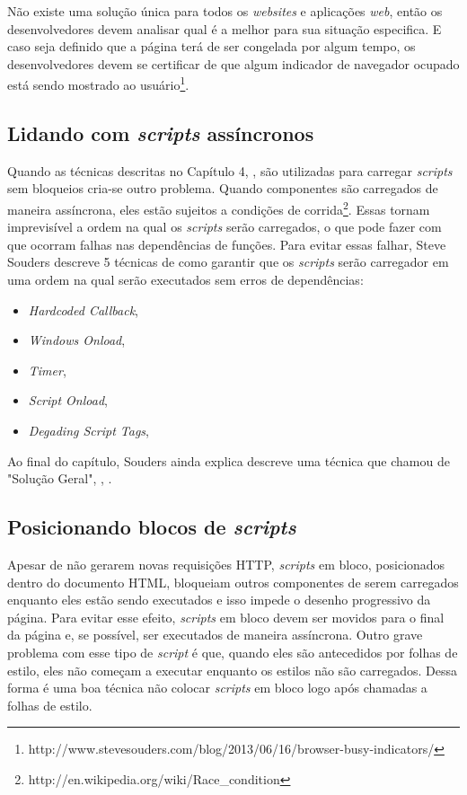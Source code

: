 Não existe uma solução única para todos os \textit{websites} e aplicações \textit{web}, então os desenvolvedores devem analisar qual é a melhor para sua situação especifica. E caso seja definido que a página terá de ser congelada por algum tempo, os desenvolvedores devem se certificar de que algum indicador de navegador ocupado está sendo mostrado ao usuário\footnote{http://www.stevesouders.com/blog/2013/06/16/browser-busy-indicators/}.

\subsection{Lidando com \textit{scripts} assíncronos}
\label{subsec:evenfaster_cap5}
Quando as técnicas descritas no Capítulo 4, \cite[p.~27]{EvenFaster}, são utilizadas para carregar \textit{scripts} sem bloqueios cria-se outro problema. Quando componentes são carregados de maneira assíncrona, eles estão sujeitos a condições de corrida\footnote{http://en.wikipedia.org/wiki/Race\_condition}. Essas tornam imprevisível a ordem na qual os \textit{scripts} serão carregados, o que pode fazer com que ocorram falhas nas dependências de funções. Para evitar essas falhar, Steve Souders descreve 5 técnicas de como garantir que os \textit{scripts} serão carregador em uma ordem na qual serão executados sem erros de dependências:

\begin{itemize}
	\item \textit{Hardcoded Callback}, \cite[p.~46]{EvenFaster}
	\item \textit{Windows Onload}, \cite[p.~47]{EvenFaster}
	\item \textit{Timer}, \cite[p.~48]{EvenFaster}
	\item \textit{Script Onload}, \cite[p.~49]{EvenFaster}
	\item \textit{Degading Script Tags}, \cite[p.~50]{EvenFaster}
\end{itemize}

Ao final do capítulo, Souders ainda explica descreve uma técnica que chamou de "Solução Geral", , \cite[p.~59]{EvenFaster}.

\subsection{Posicionando blocos de \textit{scripts}}
\label{subsec:evenfaster_cap6}
Apesar de não gerarem novas requisições HTTP, \textit{scripts} em bloco, posicionados dentro do documento HTML, bloqueiam outros componentes de serem carregados enquanto eles estão sendo executados e isso impede o desenho progressivo da página. Para evitar esse efeito, \textit{scripts} em bloco devem ser movidos para o final da página e, se possível, ser executados de maneira assíncrona. Outro grave problema com esse tipo de \textit{script} é que, quando eles são antecedidos por folhas de estilo, eles não começam a executar enquanto os estilos não são carregados. Dessa forma é uma boa técnica não colocar \textit{scripts} em bloco logo após chamadas a folhas de estilo.

